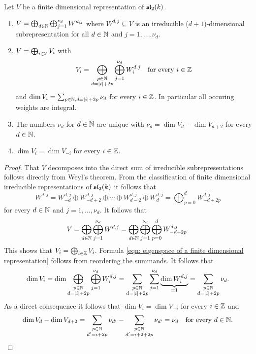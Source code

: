 \begin{thrm}\label{thrm: finite dimensional representations of sl2}
 Let $V$ be a finite dimensional representation of $\mathfrak{sl}_2(k)$.
 \begin{enumerate}[leftmargin=*]
  \item
   $V = \bigoplus_{d \in \mathbb{N}} \bigoplus_{j=1}^{\nu_d} W^{d,j}$ where $W^{d,j} \subseteq V$ is an irreducible ($d+1$)-dimensional subrepresentation for all $d \in \mathbb{N}$ and $j = 1, \dotsc, \nu_d$.
  \item
   $V = \bigoplus_{i \in \mathbb{Z}} V_i$ with
   \begin{equation}\label{eqn: eigenspace of a finite dimensional representation}
    V_i = \bigoplus_{\substack{p \in \mathbb{N} \\ d = |i|+2p}} \bigoplus_{j=1}^{\nu_d} W^{d,j}_i
    \quad \text{for every $i \in \mathbb{Z}$}
   \end{equation}
   and $\dim V_i = \sum_{p \in \mathbb{N}, d = |i|+2p} \nu_d$ for every $i \in \mathbb{Z}$. In particular all occuring weights are integral.
  \item 
   The numbers $\nu_d$ for $d \in \mathbb{N}$ are unique with $\nu_d = \dim V_d - \dim V_{d+2}$ for every $d \in \mathbb{N}$.
  \item
   $\dim V_i = \dim V_{-i}$ for every $i \in \mathbb{Z}$.
 \end{enumerate}
\end{thrm}
\begin{proof}
 That $V$ decomposes into the direct sum of irreducible subrepresentations follows directly from Weyl’s theorem. From the classification of finite dimensional irreducible representations of $\mathfrak{sl}_2(k)$ it follows that
 \[
  W^{d,j}
  = W^{d,j}_{-d} \oplus W^{d,j}_{-d+2} \oplus \dotsb \oplus W^{d,j}_{d-2} \oplus W^{d,j}_d
  = \bigoplus_{p=0}^d W^{d,j}_{-d+2p}
 \]
 for every $d \in \mathbb{N}$ and $j = 1, \dotsc, \nu_d$. It follows that
 \[
  V
  = \bigoplus_{d \in \mathbb{N}} \bigoplus_{j=1}^{\nu_d} W^{d,j}
  = \bigoplus_{d \in \mathbb{N}} \bigoplus_{j=1}^{\nu_d} \bigoplus_{p=0}^d W^{d,j}_{-d+2p}.
 \]
 This shows that $V_i = \bigoplus_{i \in \mathbb{Z}} V_i$. Formula \eqref{eqn: eigenspace of a finite dimensional representation} follows from reordering the summands. It follows that
 \[
  \dim V_i
  = \dim \bigoplus_{\substack{p \in \mathbb{N} \\ d = |i|+2p}} \bigoplus_{j=1}^{\nu_d} W^{d,j}_i
  = \sum_{\substack{p \in \mathbb{N} \\ d = |i|+2p}} \sum_{j=1}^{\nu_d} \underbrace{\dim W^{d,j}_i}_{=1}
  = \sum_{\substack{p \in \mathbb{N} \\ d = |i|+2p}} \nu_d.
 \]
 As a direct consequence it follows that $\dim V_i = \dim V_{-i}$ for every $i \in \mathbb{Z}$ and
 \[
  \dim V_d - \dim V_{d+2}
  = \sum_{\substack{p \in \mathbb{N} \\ d' = i+2p}} \nu_{d'} - \sum_{\substack{p \in \mathbb{N} \\ d' = i+2+2p}} \nu_{d'}
  = \nu_d
  \quad\text{for every $d \in \mathbb{N}$}.
 \qedhere
 \]
\end{proof}


